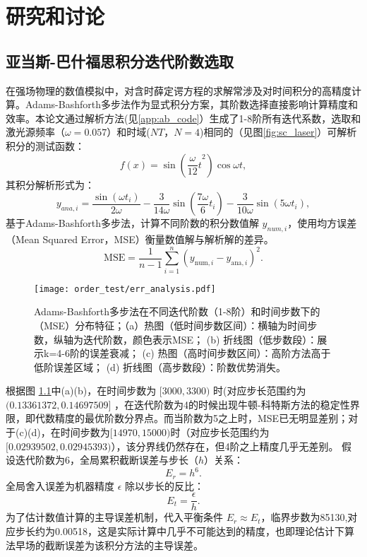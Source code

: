 \chapter{研究和讨论}
\section{亚当斯-巴什福思积分迭代阶数选取}
在强场物理的数值模拟中，对含时薛定谔方程的求解常涉及对时间积分的高精度计算。Adams-Bashforth多步法作为显式积分方案，其阶数选择直接影响计算精度和效率。本论文通过解析方法(见\ref{app:ab_code}）生成了1-8阶所有迭代系数，选取和激光源频率（$\omega = 0.057$）和时域($N T$，$N = 4$)相同的（见图\ref{fig:sc_laser}）可解析积分的测试函数：
\begin{equation}
	f(x) = \sin({\frac{\omega}{12} t}^2) \cos{\omega t},
\end{equation}
其积分解析形式为：
\begin{equation}
	y_{ana, i} = \frac{\sin{(\omega t_i)}}{2\omega} - \frac{3}{14\omega}\sin{(\frac{7\omega}{6} t_i)} - 
	\frac{3}{10\omega}\sin{(5\omega t_i)},
\end{equation}
基于​​Adams-Bashforth多步法​​，计算不同阶数的积分数值解 $y_{num, i}$，使用均方误差（​​Mean Squared Error​​，MSE）衡量数值解与解析解的差异。
\begin{equation}
	\text{MSE} = \frac{1}{n-1} \sum_{i=1}^n \left( y_{\text{num},i} - y_{\text{ana},i} \right)^2.
\end{equation}

\begin{figure}[h]  %
	\centering
	\texttt{[image: order\_test/err\_analysis.pdf]}
	\caption{Adams-Bashforth多步法在不同迭代阶数（1-8阶）和时间步数下的（MSE）分布特征；（a）热图（低时间步数区间）：横轴为时间步数，纵轴为迭代阶数，颜色表示MSE；
		(b) 折线图（低步数段）：展示k=4-6阶的误差衰减；
		(c) 热图（高时间步数区间）：高阶方法高于低阶误差区域；
		(d) 折线图（高步数段）：阶数优势消失。}
	\label{fig:err_analysis}
\end{figure}

根据图 \ref{fig:err_analysis}中(a)(b)，在时间步数为 $[3000, 3300)$ 时(对应步长范围约为 $(0.13361372, 0.14697509]$ ，在迭代阶数为4的时候出现牛顿-科特斯方法的稳定性界限，即代数精度的最优阶数分界点。而当阶数为5之上时，MSE已无明显差别；对于(c)(d)，在时间步数为$[14970, 15000)$时（对应步长范围约为 $[0.02939502, 0.02945393)$），该分界线仍然存在，但4阶之上精度几乎无差别。
假设迭代阶数为6，全局累积截断误差与步长（$h$）关系：
\begin{equation}
	E_{r} = h^6.
\end{equation}
全局舍入误差为机器精度 $\epsilon$ 除以步长的反比：
\begin{equation}
	E_{t} = \frac{\epsilon}{h}.
\end{equation}
为了估计数值计算的主导误差机制，代入平衡条件 $E_{r}\approx E_{t}$，临界步数为85130,对应步长约为0.00518，这是实际计算中几乎不可能达到的精度，也即理论估计下算法早场的截断误差为该积分方法的主导误差。

